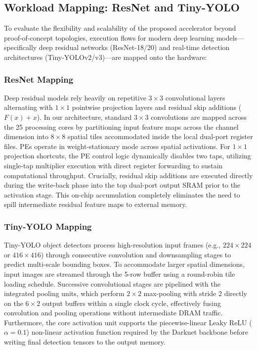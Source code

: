 \documentclass[conference]{IEEEtran}
\begin{document}
\subsection{Workload Mapping: ResNet and Tiny-YOLO}
To evaluate the flexibility and scalability of the proposed accelerator beyond proof-of-concept topologies, execution flows for modern deep learning models—specifically deep residual networks (ResNet-18/20) and real-time detection architectures (Tiny-YOLOv2/v3)—are mapped onto the hardware:

\subsubsection{ResNet Mapping}
Deep residual models rely heavily on repetitive $3\times 3$ convolutional layers alternating with $1\times 1$ pointwise projection layers and residual skip additions ($F(x) + x$). In our architecture, standard $3\times 3$ convolutions are mapped across the 25 processing cores by partitioning input feature maps across the channel dimension into $8\times 8$ spatial tiles accommodated inside the local dual-port register files. PEs operate in weight-stationary mode across spatial activations. For $1\times 1$ projection shortcuts, the PE control logic dynamically disables two taps, utilizing single-tap multiplier execution with direct register forwarding to sustain computational throughput. Crucially, residual skip additions are executed directly during the write-back phase into the top dual-port output SRAM prior to the activation stage. This on-chip accumulation completely eliminates the need to spill intermediate residual feature maps to external memory.

\subsubsection{Tiny-YOLO Mapping}
Tiny-YOLO object detectors process high-resolution input frames (e.g., $224\times 224$ or $416\times 416$) through consecutive convolution and downsampling stages to predict multi-scale bounding boxes. To accommodate larger spatial dimensions, input images are streamed through the 5-row buffer using a round-robin tile loading schedule. Successive convolutional stages are pipelined with the integrated pooling units, which perform $2\times 2$ max-pooling with stride 2 directly on the $6\times 2$ output buffers within a single clock cycle, effectively fusing convolution and pooling operations without intermediate DRAM traffic. Furthermore, the core activation unit supports the piecewise-linear Leaky ReLU ($\alpha = 0.1$) non-linear activation function required by the Darknet backbone before writing final detection tensors to the output memory.
\end{document}
